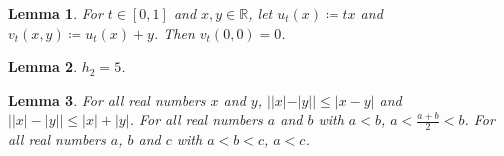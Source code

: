 \documentclass{article}
\newtheorem{lemma}{Lemma}
\begin{document}
\begin{lemma}\label{lem:family}
For $t\in[0,1]$ and $x,y\in\mathbb{R}$, let $u_t(x)\coloneqq tx$ and $v_t(x,y)\coloneqq u_t(x)+y$.
Then $v_t(0,0)=0$.
\end{lemma}

\begin{lemma}\label{lem:notation}
$h_2=5$.
\end{lemma}
\begin{lemma}\label{nested-bars}
For all real numbers $x$ and $y$, $||x|-|y||\le|x-y|$ and $\big||x|-|y|\big|\le|x|+|y|$. For all real numbers $a$ and $b$ with $a<b$, $a<\frac{a+b}{2}<b$. For all real numbers $a$, $b$ and $c$ with $a<b<c$, $a<c$.
\end{lemma}
\end{document}

